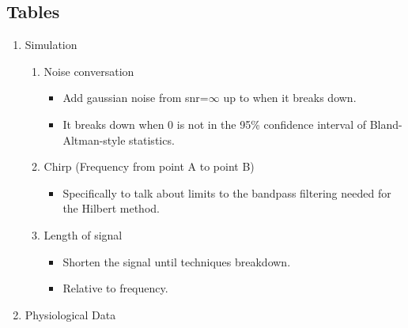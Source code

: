 \documentclass{article}
\begin{document}
	\subsection*{Tables}
		\begin{enumerate}
			\item Simulation
			\begin{enumerate}
			\item Noise conversation
				\begin{itemize}
					\item Add gaussian noise from snr=$\infty$ up to when it breaks down.
					\item It breaks down when 0 is not in the 95\% confidence interval of Bland-Altman-style statistics.		
				\end{itemize}
			\item Chirp (Frequency from point A to point B)
				\begin{itemize}
					\item Specifically to talk about limits to the bandpass filtering needed for the Hilbert method.
				\end{itemize}
			\item Length of signal
				\begin{itemize}
					\item Shorten the signal until techniques breakdown.
					\item Relative to frequency.
				\end{itemize}		
			\end{enumerate}
			\item Physiological Data
				
		\end{enumerate}
		


\end{document}
